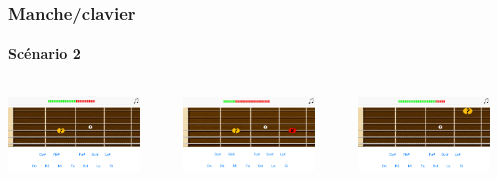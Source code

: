 \documentclass{beamer}
\begin{document}
	\begin{frame}

   		\frametitle{Manche/clavier}

       		\framesubtitle{Scénario 2}

	\begin{columns}

	 	\begin{column}{0.33\textwidth}

		\includegraphics[width=3.5cm]{images/clavier_question.png}

		\end{column}

	 \begin{column}{0.33\textwidth}

		\includegraphics[width=3.5cm]{images/clavier_mauvaise.png}

	\end{column}

	 \begin{column}{0.33\textwidth}

		\includegraphics[width=3.5cm]{images/clavier_bonne_reponse_nouvelle_question.png}

	\end{column}

	\end{columns} 

	\end{frame}


\end{document}
